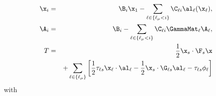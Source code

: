 \begin{eqnarray}
\x_{i} &=& \B_i \x_1 - \sum_{\ell \in \{\ell_\mu<i\}} \C_{\ell i} \al_\ell(\x_\ell), \\
\A_{i} &=& \B_i - \sum_{\ell \in \{\ell_\mu<i\}} \C_{\ell i} \GammaMat_\ell \A_\ell, \\
T &=& \frac{1}{2} \x_s \cdot \F_s \x \nonumber \\
&&+ \sum\limits_{\ell \in \{\ell_\mu\}}\left[\frac{1}{2}\tau_{\ell s} \x_\ell \cdot \al_\ell -\frac{1}{2}\x_s \cdot \G_{\ell s}\al_\ell -\tau_{\ell s}\phi_\ell \right]
\end{eqnarray}
\normalsize
with
  